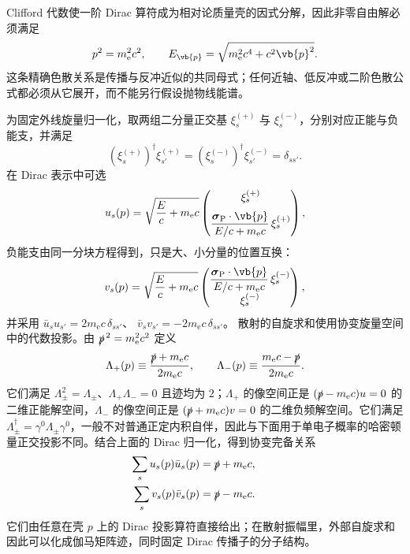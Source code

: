 Clifford 代数使一阶 Dirac 算符成为相对论质量壳的因式分解，因此非零自由解必须满足
\begin{equation}
 {
 p^2=m_{\mathrm e}^2c^2,
 \qquad
 E_{\vb{p}}=\sqrt{m_{\mathrm e}^2c^4+c^2\vb{p}^2}.}
 \label{eq:rel-dispersion}\end{equation}
这条精确色散关系是传播与反冲近似的共同母式；任何近轴、低反冲或二阶色散公式都必须从它展开，而不能另行假设抛物线能谱。

为固定外线旋量归一化，取两组二分量正交基 $\xi_s^{(+)}$ 与 $\xi_s^{(-)}$，分别对应正能与负能支，并满足
\[
(\xi_s^{(+)})^\dagger\xi_{s'}^{(+)}=(\xi_s^{(-)})^\dagger\xi_{s'}^{(-)}=\delta_{ss'}.
\]
在 Dirac 表示中可选
\begin{equation}
 u_s(p)=
 \sqrt{\frac{E}{c}+m_{\mathrm e} c}
 \begin{pmatrix}
 \xi_s^{(+)}\\[2mm]
 \dfrac{\boldsymbol\sigma_{\rm P}\cdot\vb{p}}{E/c+m_{\mathrm e} c}\,\xi_s^{(+)}
 \end{pmatrix},
 \label{eq:explicit-u}
\end{equation}
负能支由同一分块方程得到，只是大、小分量的位置互换：
\begin{equation}
 v_s(p)=
 \sqrt{\frac{E}{c}+m_{\mathrm e} c}
 \begin{pmatrix}
 \dfrac{\boldsymbol\sigma_{\rm P}\cdot\vb{p}}{E/c+m_{\mathrm e} c}\,\xi_s^{(-)}\\[2mm]
 \xi_s^{(-)}
 \end{pmatrix},
 \label{eq:explicit-v}
\end{equation}
并采用
$\bar u_su_{s'}=2m_{\mathrm e} c\,\delta_{ss'}$、
$\bar v_sv_{s'}=-2m_{\mathrm e} c\,\delta_{ss'}$。
散射的自旋求和使用协变旋量空间中的代数投影。由 $\slashed p^{\,2}=m_{\mathrm e}^2c^2$ 定义
\begin{equation*}
\Lambda_+(p)\equiv\frac{\slashed p+m_{\mathrm e} c}{2m_{\mathrm e} c},
\qquad
\Lambda_-(p)\equiv\frac{m_{\mathrm e} c-\slashed p}{2m_{\mathrm e} c}.
\end{equation*}
它们满足 $\Lambda_\pm^2=\Lambda_\pm$、$\Lambda_+\Lambda_-=0$ 且迹均为 $2$；$\Lambda_+$ 的像空间正是 $(\slashed p-m_{\mathrm e} c)u=0$ 的二维正能解空间，$\Lambda_-$ 的像空间正是 $(\slashed p+m_{\mathrm e} c)v=0$ 的二维负频解空间。它们满足 $\Lambda_\pm^\dagger=\gamma^0\Lambda_\pm\gamma^0$，一般不对普通正定内积自伴，因此与下面用于单电子概率的哈密顿量正交投影不同。结合上面的 Dirac 归一化，得到协变完备关系
\begin{align}
 {\sum_su_s(p)\bar u_s(p)=\slashed p+m_{\mathrm e} c,}
 &\qquad \label{eq:u-complete}\\
 {\sum_sv_s(p)\bar v_s(p)=\slashed p-m_{\mathrm e} c.}
 &\qquad \label{eq:v-complete}
\end{align}
它们由任意在壳 $p$ 上的 Dirac 投影算符直接给出；在散射振幅里，外部自旋求和因此可以化成伽马矩阵迹，同时固定 Dirac 传播子的分子结构。


